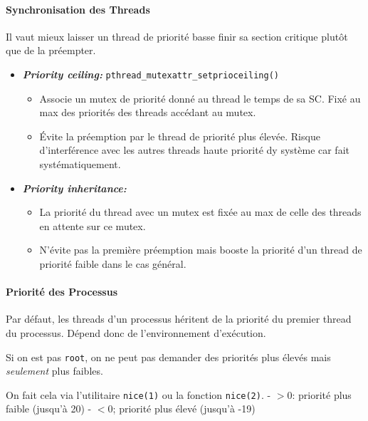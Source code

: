 \paragraph{Synchronisation des
Threads}\label{synchronisation-des-threads}

Il vaut mieux laisser un thread de priorité basse finir sa section
critique plutôt que de la préempter.

\begin{itemize}
\tightlist
\item
  \textbf{\emph{Priority ceiling:}}
  \texttt{pthread\_mutexattr\_setprioceiling()}

  \begin{itemize}
  \tightlist
  \item
    Associe un mutex de priorité donné au thread le temps de sa SC. Fixé
    au max des priorités des threads accédant au mutex.
  \item
    Évite la préemption par le thread de priorité plus élevée. Risque
    d'interférence avec les autres threads haute priorité dy système car
    fait systématiquement.
  \end{itemize}
\item
  \textbf{\emph{Priority inheritance:}}

  \begin{itemize}
  \tightlist
  \item
    La priorité du thread avec un mutex est fixée au max de celle des
    threads en attente sur ce mutex.
  \item
    N'évite pas la première préemption mais booste la priorité d'un
    thread de priorité faible dans le cas général.
  \end{itemize}
\end{itemize}

\paragraph{Priorité des Processus}\label{priorituxe9-des-processus}

Par défaut, les threads d'un processus héritent de la priorité du
premier thread du processus. Dépend donc de l'environnement d'exécution.

Si on est pas \texttt{root}, on ne peut pas demander des priorités plus
élevés mais \emph{seulement} plus faibles.

On fait cela via l'utilitaire \texttt{nice(1)} ou la fonction
\texttt{nice(2)}. - \(>0\): priorité plus faible (jusqu'à 20) - \(<0\);
priorité plus élevé (jusqu'à -19)

